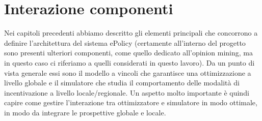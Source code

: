 








%
\clearpage{\pagestyle{empty}\cleardoublepage}
\chapter{\nohyphens{Interazione componenti}}
Nei capitoli precedenti abbiamo descritto gli elementi principali che concorrono a definire l'architettura del sistema ePolicy (certamente all'interno del progetto sono presenti ulteriori componenti, come quello dedicato all'opinion mining, ma in questo caso ci riferiamo a quelli considerati in questo lavoro). Da un punto di vista generale essi sono il modello a vincoli che garantisce una ottimizzazione a livello globale e il simulatore che studia il comportamento delle modalità di incentivazione a livello locale/regionale. Un aspetto molto importante è quindi capire come gestire l'interazione tra ottimizzatore e simulatore in modo ottimale, in modo da integrare le prospettive globale e locale.

